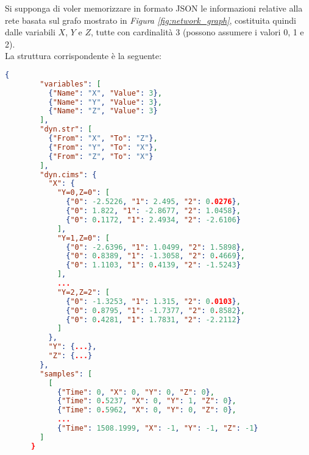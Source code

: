   \begin{exmp}
    Si supponga di voler memorizzare in formato JSON le informazioni relative alla rete
    basata sul grafo mostrato in \textit{Figura \ref{fig:network_graph}}, costituita quindi dalle variabili $X$, $Y$ e $Z$,
    tutte con cardinalità 3 (possono assumere i valori 0, 1 e 2).\\
    La struttura corrispondente è la seguente:

    \begin{lstlisting}[language=json]
      {
        "variables": [
          {"Name": "X", "Value": 3}, 
          {"Name": "Y", "Value": 3}, 
          {"Name": "Z", "Value": 3}
        ],
        "dyn.str": [
          {"From": "X", "To": "Z"}, 
          {"From": "Y", "To": "X"}, 
          {"From": "Z", "To": "X"}
        ],
        "dyn.cims": {
          "X": {
            "Y=0,Z=0": [
              {"0": -2.5226, "1": 2.495, "2": 0.0276}, 
              {"0": 1.822, "1": -2.8677, "2": 1.0458}, 
              {"0": 0.1172, "1": 2.4934, "2": -2.6106}
            ], 
            "Y=1,Z=0": [
              {"0": -2.6396, "1": 1.0499, "2": 1.5898}, 
              {"0": 0.8389, "1": -1.3058, "2": 0.4669}, 
              {"0": 1.1103, "1": 0.4139, "2": -1.5243}
            ], 
            ...
            "Y=2,Z=2": [
              {"0": -1.3253, "1": 1.315, "2": 0.0103}, 
              {"0": 0.8795, "1": -1.7377, "2": 0.8582}, 
              {"0": 0.4281, "1": 1.7831, "2": -2.2112}
            ]
          },
          "Y": {...},
          "Z": {...}
        },
        "samples": [
          [
            {"Time": 0, "X": 0, "Y": 0, "Z": 0}, 
            {"Time": 0.5237, "X": 0, "Y": 1, "Z": 0}, 
            {"Time": 0.5962, "X": 0, "Y": 0, "Z": 0},
            ...
            {"Time": 1508.1999, "X": -1, "Y": -1, "Z": -1}
        ]
      }
    \end{lstlisting}
  \end{exmp}


